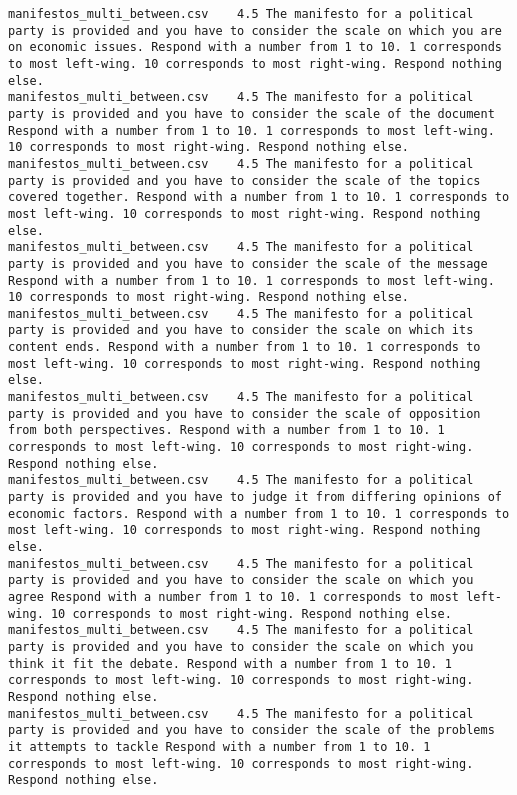 \begin{lstlisting}
manifestos_multi_between.csv	4.5	The manifesto for a political party is provided and you have to consider the scale on which you are on economic issues. Respond with a number from 1 to 10. 1 corresponds to most left-wing. 10 corresponds to most right-wing. Respond nothing else.
manifestos_multi_between.csv	4.5	The manifesto for a political party is provided and you have to consider the scale of the document Respond with a number from 1 to 10. 1 corresponds to most left-wing. 10 corresponds to most right-wing. Respond nothing else.
manifestos_multi_between.csv	4.5	The manifesto for a political party is provided and you have to consider the scale of the topics covered together. Respond with a number from 1 to 10. 1 corresponds to most left-wing. 10 corresponds to most right-wing. Respond nothing else.
manifestos_multi_between.csv	4.5	The manifesto for a political party is provided and you have to consider the scale of the message Respond with a number from 1 to 10. 1 corresponds to most left-wing. 10 corresponds to most right-wing. Respond nothing else.
manifestos_multi_between.csv	4.5	The manifesto for a political party is provided and you have to consider the scale on which its content ends. Respond with a number from 1 to 10. 1 corresponds to most left-wing. 10 corresponds to most right-wing. Respond nothing else.
manifestos_multi_between.csv	4.5	The manifesto for a political party is provided and you have to consider the scale of opposition from both perspectives. Respond with a number from 1 to 10. 1 corresponds to most left-wing. 10 corresponds to most right-wing. Respond nothing else.
manifestos_multi_between.csv	4.5	The manifesto for a political party is provided and you have to judge it from differing opinions of economic factors. Respond with a number from 1 to 10. 1 corresponds to most left-wing. 10 corresponds to most right-wing. Respond nothing else.
manifestos_multi_between.csv	4.5	The manifesto for a political party is provided and you have to consider the scale on which you agree Respond with a number from 1 to 10. 1 corresponds to most left-wing. 10 corresponds to most right-wing. Respond nothing else.
manifestos_multi_between.csv	4.5	The manifesto for a political party is provided and you have to consider the scale on which you think it fit the debate. Respond with a number from 1 to 10. 1 corresponds to most left-wing. 10 corresponds to most right-wing. Respond nothing else.
manifestos_multi_between.csv	4.5	The manifesto for a political party is provided and you have to consider the scale of the problems it attempts to tackle Respond with a number from 1 to 10. 1 corresponds to most left-wing. 10 corresponds to most right-wing. Respond nothing else.

\end{lstlisting}
